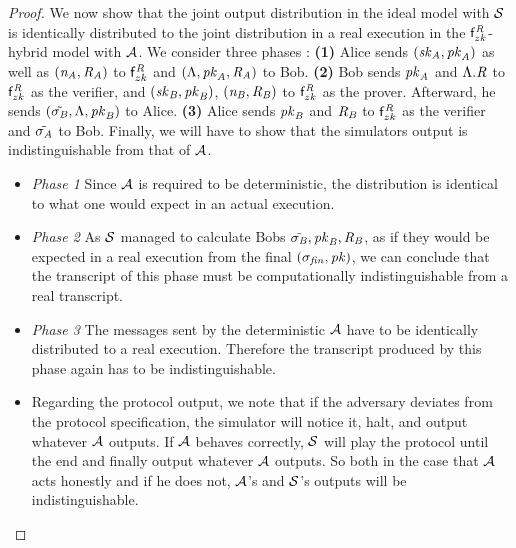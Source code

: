 \begin{proof}
    We now show that the joint output distribution in the ideal model with $\mathcal{S}$ is identically distributed to the joint distribution in a real execution in the $\mathsf{f}^{\mathit{R}}_{zk}$-hybrid model with $\mathcal{A}$.
    We consider three phases :
    \textbf{(1)} Alice sends $(\mathit{sk}_{\mathit{A}}, \mathit{pk}_{\mathit{A}})$ as well as $(\mathit{\mathit{n}_{\mathit{A}}}, \mathit{R}_{\mathit{A}})$ to $\mathsf{f}^{\mathit{R}}_{zk}$ and $(\Lambda, \mathit{pk}_{\mathit{A}}, \mathit{R}_{\mathit{A}})$ to Bob.
    \textbf{(2)} Bob sends $\mathit{pk}_{\mathit{A}}$ and $\Lambda.\mathit{R}$ to $\mathsf{f}^{\mathit{R}}_{zk}$ as the verifier, and  $(\mathit{sk}_{\mathit{B}}, \mathit{pk}_{\mathit{B}})$, $(\mathit{\mathit{n}_{\mathit{B}}}, \mathit{R}_{\mathit{B}})$ to $\mathsf{f}^{\mathit{R}}_{zk}$ as the prover.
    Afterward, he sends $(\tilde{\sigma_{\mathit{B}}}, \Lambda, \mathit{pk}_{\mathit{B}})$ to Alice.
    \textbf{(3)} Alice sends $\mathit{pk}_{\mathit{B}}$ and $\mathit{R}_{\mathit{B}}$ to $\mathsf{f}^{\mathit{R}}_{zk}$ as the verifier and $\tilde{\sigma_{\mathit{A}}}$ to Bob.
    Finally, we will have to show that the simulators output is indistinguishable from that of $\mathcal{A}$.

    \begin{itemize}
        \item \textit{Phase 1} Since $\mathcal{A}$ is required to be deterministic, the distribution is identical to what one would expect in an actual execution.
        \item \textit{Phase 2} As $\mathcal{S}$ managed to calculate Bobs $\tilde{\sigma_{\mathit{B}}}, \mathit{pk}_{\mathit{B}}, \mathit{R}_{\mathit{B}}$, as if they would be expected in a real execution from the final $(\sigma_{\mathit{fin}}, \mathit{pk})$, we can conclude that the transcript of this phase must be computationally indistinguishable from a real transcript.
        \item \textit{Phase 3} The messages sent by the deterministic $\mathcal{A}$  have to be identically distributed to a real execution.
        Therefore the transcript produced by this phase again has to be indistinguishable.
        \item Regarding the protocol output, we note that if the adversary deviates from the protocol specification, the simulator will notice it, halt, and output whatever $\mathcal{A}$ outputs.
        If $\mathcal{A}$ behaves correctly, $\mathcal{S}$ will play the protocol until the end and finally output whatever $\mathcal{A}$ outputs.
        So both in the case that $\mathcal{A}$ acts honestly and if he does not, $\mathcal{A}$'s and $\mathcal{S}$'s outputs will be indistinguishable.
    \end{itemize}


\end{proof}
